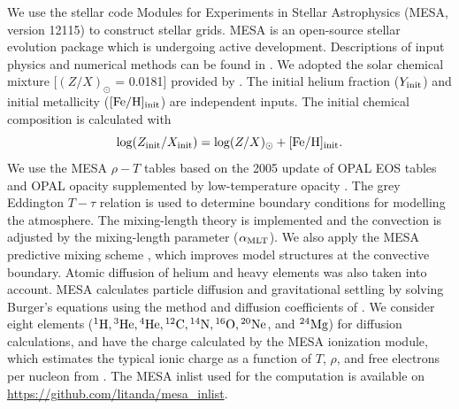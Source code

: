 We use the stellar code Modules for Experiments in Stellar Astrophysics
(\textsc{MESA}, version 12115) to construct stellar grids. 
\textsc{MESA} is an open-source stellar evolution package which is undergoing active development. 
Descriptions of input physics and numerical methods
can be found in \citet{2011ApJS..192....3P,2013ApJS..208....4P, 2015ApJS..220...15P}.
We adopted the solar chemical mixture [$(Z/X)_{\odot}$ = 0.0181]
provided by \citet{2009ARA&A..47..481A}. 
The initial helium fraction ($Y_{\rm init}$) and initial metallicity ($\rm{[Fe/H]_{init}}$) are independent inputs. 
The initial chemical composition is calculated with 
\begin{equation}
\log (Z_{\rm{init}}/X_{\rm{init}}) = \log (Z/X)_{\odot} + \rm{[Fe/H]_{init}}.  \\
\end{equation}
We use the \textsc{MESA} $\rho-T$ tables based on the 2005
update of OPAL EOS tables \citep{2002ApJ...576.1064R} and OPAL opacity
supplemented by low-temperature opacity \citep{2005ApJ...623..585F}. 
The grey Eddington $T-\tau$ relation is used to determine boundary conditions for modelling the atmosphere.
The mixing-length theory is implemented and the convection is adjusted by the mixing-length parameter ($\alpha_{\rm MLT}$).
We also apply the \textsc{MESA} predictive mixing scheme \citep{2018ApJS..234...34P,2019ApJS..243...10P}, which improves model structures at the convective boundary.  
Atomic diffusion of helium and heavy elements was also taken into account. MESA calculates particle diffusion and gravitational settling by solving Burger's equations using the method and diffusion coefficients of \citet{Thoul94}. 
We consider eight elements (${}^1{\rm H}, {}^3{\rm He}, {}^4{\rm He}, {}^{12}{\rm C}, {}^{14}{\rm N}, {}^{16}{\rm O}, {}^{20}{\rm Ne}$, and ${}^{24}{\rm Mg}$)
for diffusion calculations, and have the charge calculated by the MESA ionization module, which estimates the typical ionic charge as a function of $T$, $\rho$, and free electrons per nucleon from \citet{Paquette1986}.
The \textsc{MESA} inlist used for the computation is available on \url{https://github.com/litanda/mesa_inlist}.  


